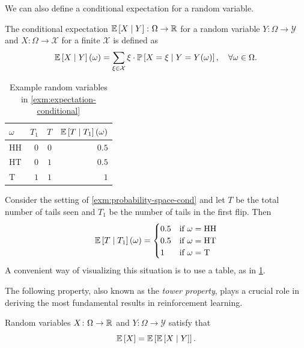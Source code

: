 \documentclass[letterpaper,11pt]{article}
\begin{document}
We can also define a conditional expectation for a random variable.
\begin{defn}
The conditional expectation $\mathbb{E}\left[ X \mid  Y \right]\colon \Omega \to \mathbb{R}$ for a random variable $Y\colon \Omega \to \mathcal{Y}$ and $X \colon \Omega \to \mathcal{X}$ for a finite $\mathcal{X}$ is defined as
\[
  \mathbb{E}\left[ X \mid Y \right](\omega)
  =
  \sum_{{\xi \in \mathcal{X}}}  \xi \cdot  \mathbb{P}\left[ X = \xi  \mid  Y = Y(\omega) \right],
  \quad \forall \omega \in \Omega .  
\]
\end{defn}

\begin{table}
  \centering
  \begin{tabular}{lrrr}
    \toprule
    $\omega$ & \multicolumn{1}{c}{$T_1$} & \multicolumn{1}{c}{$T$} & \multicolumn{1}{c}{$\mathbb{E}\left[ T \mid T_1 \right](\omega)$} \\
    \midrule
    $\mathrm{HH}$ & $0$ & $0$ & $0.5$ \\
    $\mathrm{HT}$ & $0$ & $1$ & $0.5$ \\
    $\mathrm{T}$  & $1$ & $1$ & $1$ \\
    \bottomrule
  \end{tabular}
  \caption{Example random variables in \cref{exm:expectation-conditional}}
  \label{tab:expect-cond}
\end{table}

\begin{example} \label{exm:expectation-conditional}
  Consider the setting of \cref{exm:probability-space-cond} and let $T$ be the total number of tails seen and $T_1$ be the number of tails in the first flip. Then
  \[
    \mathbb{E}\left[ T \mid T_1 \right](\omega)
    =
    \begin{cases}
    0.5  &\text{if } \omega = \mathrm{HH} \\
    0.5  &\text{if } \omega = \mathrm{HT} \\
    1  &\text{if } \omega = \mathrm{T} \\
    \end{cases}
  \]
  A convenient way of visualizing this situation is to use a table, as in \cref{tab:expect-cond}. 
\end{example}

The following property, also known as the \emph{tower property}, plays a crucial role in deriving the most fundamental results in reinforcement learning.
\begin{theorem}
  Random variables $X\colon \Omega \to \mathbb{R}$ and $Y\colon \Omega \to \mathcal{Y}$ satisfy that
  \[
\mathbb{E}\left[ X \right] = \mathbb{E}\left[ \mathbb{E}\left[ X \mid Y \right] \right].
  \]
\end{theorem}
\end{document}
